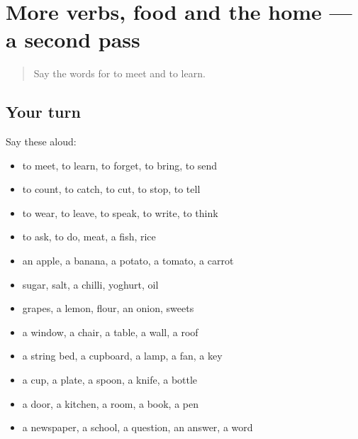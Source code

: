 \section[(dialogue)]{More verbs, food and the home — a second pass}

\label{lesson:MW-R66-second-pass-more-verbs-food-and-the-home}



\begin{quote}
Say the words for to meet and to learn.
\end{quote}

\subsection*{Your turn}
Say these aloud:

\begin{itemize}
\raggedright
  \item to meet, to learn, to forget, to bring, to send
  \item to count, to catch, to cut, to stop, to tell
  \item to wear, to leave, to speak, to write, to think
  \item to ask, to do, meat, a fish, rice
  \item an apple, a banana, a potato, a tomato, a carrot
  \item sugar, salt, a chilli, yoghurt, oil
  \item grapes, a lemon, flour, an onion, sweets
  \item a window, a chair, a table, a wall, a roof
  \item a string bed, a cupboard, a lamp, a fan, a key
  \item a cup, a plate, a spoon, a knife, a bottle
  \item a door, a kitchen, a room, a book, a pen
  \item a newspaper, a school, a question, an answer, a word
\end{itemize}

